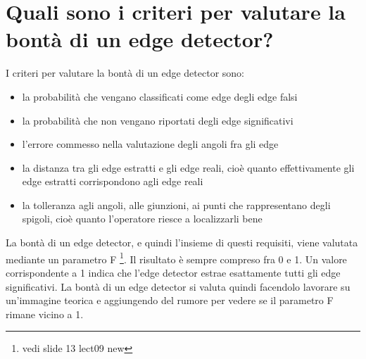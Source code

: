 \section{Quali sono i criteri per valutare la bontà di un edge detector?}
I criteri per valutare la bontà di un edge detector sono:
\begin{itemize}
	\item la probabilità che vengano classificati come edge degli edge falsi
	
	\item la probabilità che non vengano riportati degli edge significativi
	
	\item l'errore commesso nella valutazione degli angoli fra gli edge
	
	\item la distanza tra gli edge estratti e gli edge reali, cioè quanto effettivamente gli edge estratti corrispondono agli edge reali
	
	\item la tolleranza agli angoli, alle giunzioni, ai punti che rappresentano degli spigoli, cioè quanto l'operatore riesce a localizzarli bene
\end{itemize}

La bontà di un edge detector, e quindi l'insieme di questi requisiti, viene valutata mediante un parametro F \footnote{vedi slide 13 lect09 new}. Il risultato è sempre compreso fra 0 e 1. Un valore corrispondente a 1 indica che l'edge detector estrae esattamente tutti gli edge significativi. La bontà di un edge detector si valuta quindi facendolo lavorare su un'immagine teorica e aggiungendo del rumore per vedere se il parametro F rimane vicino a 1.